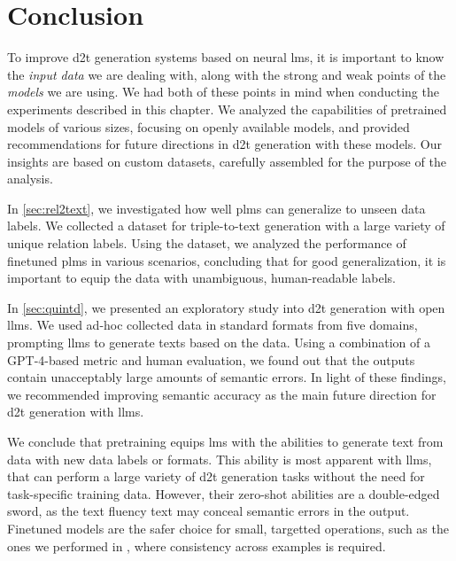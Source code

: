 \section{Conclusion}
To improve \ac{d2t} generation systems based on neural \acp{lm}, it is important to know the \emph{input data} we are dealing with, along with the strong and weak points of the \emph{models} we are using. We had both of these points in mind when conducting the experiments described in this chapter. We analyzed the capabilities of pretrained models of various sizes, focusing on openly available models, and provided recommendations for future directions in \ac{d2t} generation with these models. Our insights are based on custom datasets, carefully assembled for the purpose of the analysis.

In \autoref{sec:rel2text}, we investigated how well \acp{plm} can generalize to unseen data labels. We collected a dataset for triple-to-text generation with a large variety of unique relation labels. Using the dataset, we analyzed the performance of finetuned \acp{plm} in various scenarios, concluding that for good generalization, it is important to equip the data with unambiguous, human-readable labels.


In \autoref{sec:quintd}, we presented an exploratory study into \ac{d2t} generation with open \acp{llm}. We used ad-hoc collected data in standard formats from five domains, prompting \acp{llm} to generate texts based on the data. Using a combination of a GPT-4-based metric and human evaluation, we found out that the outputs contain unacceptably large amounts of semantic errors. In light of these findings, we recommended improving semantic accuracy as the main future direction for \ac{d2t} generation with \acp{llm}.

We conclude that pretraining equips \acp{lm} with the abilities to generate text from data with new data labels or formats. This ability is most apparent with \acp{llm}, that can perform a large variety of \ac{d2t} generation tasks without the need for task-specific training data. However, their zero-shot abilities are a double-edged sword, as the text fluency text may conceal semantic errors in the output. Finetuned models are the safer choice for small, targetted operations, such as the ones we performed in , where consistency across examples is required.